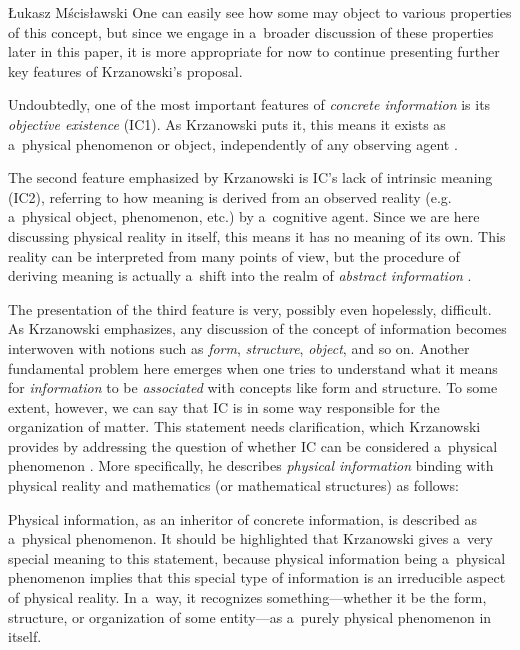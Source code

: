 \begin{artengenv}{Łukasz Mścisławski}
One can easily see how some may object to various properties of this concept, but since we engage in a~broader discussion of these properties later in this paper, it is more appropriate for now to continue presenting further key features of Krzanowski's proposal.

Undoubtedly, one of the most important features of \textit{concrete information} is its \textit{objective existence} (IC1). As Krzanowski puts it, this means it exists as a~physical phenomenon or object, independently of any observing agent
\parencite[cf.][pp.4–5]{krzanowski_what_2020}.%


The second feature emphasized by Krzanowski is IC's lack of intrinsic meaning (IC2), referring to how meaning is derived from an observed reality (e.g. a~physical object, phenomenon, etc.) by a~cognitive agent. Since we are here discussing physical reality in itself, this means it has no meaning of its own. This reality can be interpreted from many points of view, but the procedure of deriving meaning is actually a~shift into the realm of \textit{abstract information}
\parencite[cf.][pp.5–6]{krzanowski_what_2020}.%


The presentation of the third feature is very, possibly even hopelessly, difficult. As Krzanowski emphasizes, any discussion of the concept of information becomes interwoven with notions such as \textit{form}, \textit{structure}, \textit{object}, and so on. Another fundamental problem here emerges when one tries to understand what it means for \textit{information} to be \textit{associated} with concepts like form and structure. To some extent, however, we can say that IC is in some way responsible for the organization of matter. This statement needs clarification, which Krzanowski provides by addressing the question of whether IC can be considered a~physical phenomenon
\parencite[cf.][pp.3–4]{krzanowski_what_2020}. %
 More specifically, he describes \textit{physical information} binding with physical reality and mathematics (or mathematical structures) as follows:
\begin{mscislaw}
\item  Physical information, as an inheritor of concrete information, is described as a~physical phenomenon. It should be highlighted that Krzanowski gives a~very special meaning to this statement, because physical information being a~physical phenomenon implies that this special type of information is an irreducible aspect of physical reality. In a~way, it recognizes something—whether it be the form, structure, or organization of some entity—as a~purely physical phenomenon in itself.


\end{mscislaw}
\end{artengenv}

